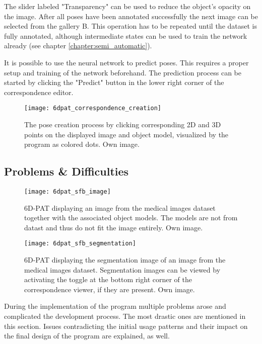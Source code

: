 The slider labeled "Transparency" can be used to reduce the object's opacity on the image. After all poses have been annotated successfully the next image can be selected from the gallery B. This operation has to be repeated until the dataset is fully annotated, although intermediate states can be used to train the network already (see chapter \ref{chapter:semi_automatic}).

It is possible to use the neural network to predict poses. This requires a proper setup and training of the network beforehand. The prediction process can be started by clicking the "Predict" button in the lower right corner of the correspondence editor.

\begin{figure}[!tbp]
	\centering
    \texttt{[image: 6dpat\_correspondence\_creation]}
    \caption{The pose creation process by clicking corresponding 2D and 3D points on the displayed image and object model, visualized by the program as colored dots. Own image.}
    \label{fig:6dpat_correspondence_creation}
\end{figure} 

\subsection{Problems \& Difficulties} \label{section:6dpat_difficulties}

\begin{figure}[!tbp]
	\centering
    \texttt{[image: 6dpat\_sfb\_image]}
    \caption{6D-PAT displaying an image from the medical images dataset together with the associated object models. The models are not from datast and thus do not fit the image entirely. Own image.}
    \label{fig:6dpat_sfb_image}
\end{figure} 

\begin{figure}[!tbp]
	\centering
    \texttt{[image: 6dpat\_sfb\_segmentation]}
    \caption{6D-PAT displaying the segmentation image of an image from the medical images dataset. Segmentation images can be viewed by activating the toggle at the bottom right corner of the correspondence viewer, if they are present. Own image.}
    \label{fig:6dpat_sfb_segmentation}
\end{figure} 

During the implementation of the program multiple problems arose and complicated the development process. The most drastic ones are mentioned in this section. Issues contradicting the initial usage patterns and their impact on the final design of the program are explained, as well. \\

